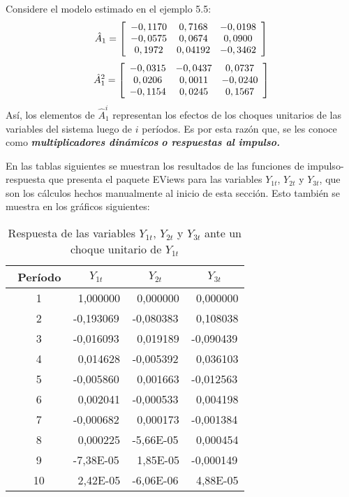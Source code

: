Considere el modelo estimado en el ejemplo 5.5:
\[
\hat{A}_{1}=\left[ {\begin{array}{*{20}c}
-0,1170 & 0,7168 & -0,0198\\
-0,0575 & 0,0674 & 0,0900\\
0,1972 & 0,04192 & -0,3462\\
\end{array} } \right]
\]
\[
\hat{A}_{1}^{2}=\left[ {\begin{array}{*{20}c}
-0,0315 & -0,0437 & 0,0737\\
0,0206 & 0,0011 & -0,0240\\
-0,1154 & 0,0245 & 0,1567\\
\end{array} } \right]
\]
As\'{i}, los elementos de $\hat{A}_{1}^{i}$ representan los efectos de los choques unitarios de las variables del sistema luego de $i$ per\'{i}odos. Es por esta raz\'{o}n que, se les conoce como \textbf{\textit{multiplicadores din\'{a}micos}}\textbf{\textit{ o respuestas al impulso.}}\newline

En las tablas siguientes se muestran los resultados de las funciones de impulso-respuesta que presenta el paquete EViews para las variables $Y_{1t}$, $Y_{2t}$ y $Y_{3t}$, que son los c\'{a}lculos hechos manualmente al inicio de esta secci\'{o}n. Esto tambi\'{e}n se muestra en los gr\'{a}ficos siguientes:

\begin{table}[H]
\centering
\begin{tabular}{cccc}\hline\hline
~Per\'{i}odo & $Y_{1t}$ & $Y_{2t}$ & $Y_{3t}$\\ \hline\hline
~1 & ~1,000000 & ~0,000000 & ~0,000000 \\
~2 & -0,193069 & -0,080383 & ~0,108038 \\
~3 & -0,016093 & ~0,019189 & -0,090439 \\
~4 & ~0,014628 & -0,005392 & ~0,036103 \\
~5 & -0,005860 & ~0,001663 & -0,012563 \\
~6 & ~0,002041 & -0,000533 & ~0,004198 \\
~7 & -0,000682 & ~0,000173 & -0,001384 \\
~8 & ~0,000225 & -5,66E-05 & ~0,000454 \\
~9 & -7,38E-05 & ~1,85E-05 & -0,000149 \\
~10& ~2,42E-05 & -6,06E-06 & ~4,88E-05 \\ \hline\hline
\end{tabular}
\caption{Respuesta de las variables $Y_{1t}$, $Y_{2t}$ y $Y_{3t}$ ante un choque unitario de $Y_{1t}$}
\label{tab24}
\end{table}

